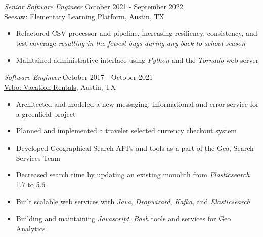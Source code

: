 \documentclass[margin, 9pt]{res} %
\begin{document}
\begin{resume}
{\sl Senior Software Engineer} \hfill October 2021 - September 2022 \\
\href{https://web.seesaw.me/}{Seesaw: Elementary Learning Platform}, Austin, TX
\begin{itemize}
    \item Refactored CSV processor and pipeline, increasing resiliency, consistency, and test coverage {\it resulting in the fewest bugs during any back to school season}
    \item Maintained administrative interface using {\it Python} and the {\it Tornado} web server
\end{itemize}

{\sl Software Engineer} \hfill October 2017 - October 2021 \\
\href{https://www.vrbo.com/}{Vrbo: Vacation Rentals}, Austin, TX
\begin{itemize}
    \item Architected and modeled a new messaging, informational and error service for a greenfield project
    \item Planned and implemented a traveler selected currency checkout system
    \item Developed Geographical Search API's and tools as a part of the Geo, Search Services Team
    \item Decreased search time by updating an existing monolith from {\it Elasticsearch} 1.7 to 5.6
    \item Built scalable web services with {\it Java}, {\it Dropwizard}, {\it Kafka}, and {\it Elasticsearch}
    \item Building and maintaining {\it Javascript}, {\it Bash} tools and services for Geo Analytics
\end{itemize}




\end{resume}
\end{document}
